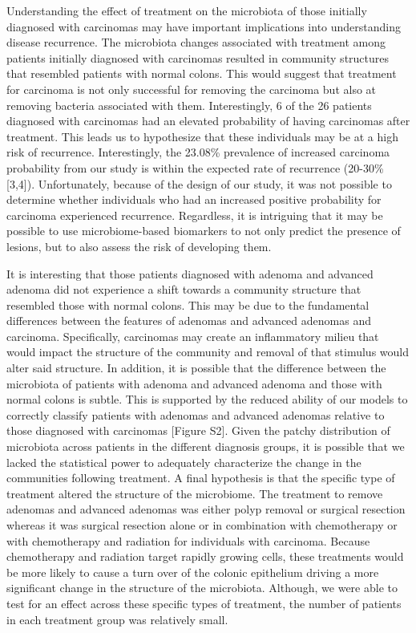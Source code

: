 \documentclass[12pt,]{article}
\begin{document}
Understanding the effect of treatment on the microbiota of those
initially diagnosed with carcinomas may have important implications into
understanding disease recurrence. The microbiota changes associated with
treatment among patients initially diagnosed with carcinomas resulted in
community structures that resembled patients with normal colons. This
would suggest that treatment for carcinoma is not only successful for
removing the carcinoma but also at removing bacteria associated with
them. Interestingly, 6 of the 26 patients diagnosed with carcinomas had
an elevated probability of having carcinomas after treatment. This leads
us to hypothesize that these individuals may be at a high risk of
recurrence. Interestingly, the 23.08\% prevalence of increased carcinoma
probability from our study is within the expected rate of recurrence
(20-30\% {[}3,4{]}). Unfortunately, because of the design of our study,
it was not possible to determine whether individuals who had an
increased positive probability for carcinoma experienced recurrence.
Regardless, it is intriguing that it may be possible to use
microbiome-based biomarkers to not only predict the presence of lesions,
but to also assess the risk of developing them.

It is interesting that those patients diagnosed with adenoma and
advanced adenoma did not experience a shift towards a community
structure that resembled those with normal colons. This may be due to
the fundamental differences between the features of adenomas and
advanced adenomas and carcinoma. Specifically, carcinomas may create an
inflammatory milieu that would impact the structure of the community and
removal of that stimulus would alter said structure. In addition, it is
possible that the difference between the microbiota of patients with
adenoma and advanced adenoma and those with normal colons is subtle.
This is supported by the reduced ability of our models to correctly
classify patients with adenomas and advanced adenomas relative to those
diagnosed with carcinomas {[}Figure S2{]}. Given the patchy distribution
of microbiota across patients in the different diagnosis groups, it is
possible that we lacked the statistical power to adequately characterize
the change in the communities following treatment. A final hypothesis is
that the specific type of treatment altered the structure of the
microbiome. The treatment to remove adenomas and advanced adenomas was
either polyp removal or surgical resection whereas it was surgical
resection alone or in combination with chemotherapy or with chemotherapy
and radiation for individuals with carcinoma. Because chemotherapy and
radiation target rapidly growing cells, these treatments would be more
likely to cause a turn over of the colonic epithelium driving a more
significant change in the structure of the microbiota. Although, we were
able to test for an effect across these specific types of treatment, the
number of patients in each treatment group was relatively small.
\end{document}
